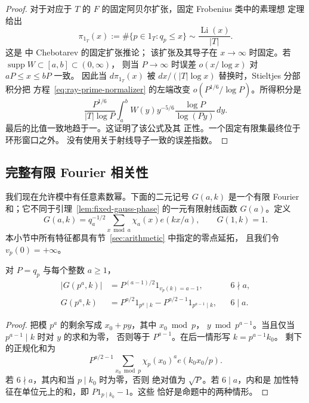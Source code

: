 \begin{proof}
对于对应于 $T$ 的 $F$ 的固定阿贝尔扩张，固定 Frobenius 类中的素理想
定理给出
\[
 \pi_{1_T}(x):=\#\{p\in1_T:q_p\le x\}
       \sim\frac{\operatorname{Li}(x)}{|T|}.
\]
这是 \cite[定理 1.1]{TZ} 中 Chebotarev 的固定扩张推论；
该扩张及其导子在
$x\to\infty$ 时固定。若 $\operatorname{supp}W\subset[a,b]\subset(0,\infty)$，
则当 $P\to\infty$ 时误差 $o(x/\log x)$ 对 $aP\le x\le bP$ 一致。
因此当
$d\pi_{1_T}(x)$ 被 $dx/(|T|\log x)$ 替换时，Stieltjes 分部积分把
方程~\eqref{eq:ray-prime-normalizer} 的左端改变 $o(P^{1/6}/\log P)$。所得积分是
\[
 \frac{P^{1/6}}{|T|\log P}
 \int_a^b W(y)y^{-5/6}\frac{\log P}{\log(Py)}\,dy.
\]
最后的比值一致地趋于一。这证明了该公式及其
正性。一个固定有限集最终位于环形窗口之外。
没有使用关于射线导子一致的误差指数。
\end{proof}

\subsection{完整有限 Fourier 相关性}\label{sec:finite-correlations}

我们现在允许模中有任意素数幂。下面的二元记号
$G(a,k)$ 是一个有限 Fourier 和；它不同于引理~\ref{lem:fixed-gauss-phase}
的一元有限射线函数 $G(a)$。定义
\begin{equation}
 G(a,k)=q_a^{-1/2}\sum_{x\bmod a}\chi_a(x)e(kx/a),\qquad G(1,k)=1.
 \label{old-eq:2.4}
\end{equation}
本小节中所有特征都具有节~\ref{sec:arithmetic} 中指定的零点延拓，
且我们令 $v_p(0)=+\infty$。

\begin{lemma}\label{lem:prime-power-fourier}
对 $P=q_p$ 与每个整数 $a\ge1$，
\begin{equation}
 \begin{aligned}
 |G(p^a,k)|&=P^{(a-1)/2}1_{v_p(k)=a-1},&&6\nmid a,\\
 G(p^a,k)&=P^{a/2}1_{p^a\mid k}
             -P^{a/2-1}1_{p^{a-1}\mid k},&&6\mid a.
 \end{aligned}
 \label{eq:gauss-local}
\end{equation}
\end{lemma}

\begin{proof}
把模 $p^a$ 的剩余写成 $x_0+py$，其中 $x_0\bmod p$，
$y\bmod p^{a-1}$。当且仅当 $p^{a-1}\mid k$ 时对 $y$ 的求和为零，
否则等于 $P^{a-1}$。在后一情形写 $k=p^{a-1}k_0$。
剩下的正规化和为
\[
 P^{a/2-1}\sum_{x_0\bmod p}\chi_p(x_0)^a e(k_0x_0/p).
\]
若 $6\nmid a$，其内和当 $p\mid k_0$ 时为零，否则
绝对值为 $\sqrt P$。若 $6\mid a$，内和是
加性特征在单位元上的和，即 $P1_{p\mid k_0}-1$。这些
恰好是命题中的两种情形。
\end{proof}

